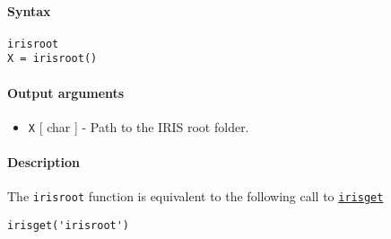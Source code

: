 


	\paragraph{Syntax}\label{syntax}

\begin{verbatim}
irisroot
X = irisroot()
\end{verbatim}

\paragraph{Output arguments}\label{output-arguments}

\begin{itemize}
\itemsep1pt\parskip0pt
\item
  \texttt{X} {[} char {]} - Path to the IRIS root folder.
\end{itemize}

\paragraph{Description}\label{description}

The \texttt{irisroot} function is equivalent to the following call to
\href{config/irisget}{\texttt{irisget}}

\begin{verbatim}
irisget('irisroot')
\end{verbatim}


